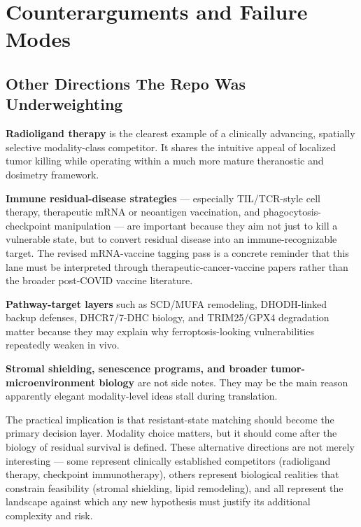 \documentclass[11pt,twoside,openright]{report}
\begin{document}
\chapter{Counterarguments and Failure Modes}


\section{Other Directions The Repo Was Underweighting}


\textbf{Radioligand therapy} is the clearest example of a clinically advancing, spatially selective modality-class competitor. It shares the intuitive appeal of localized tumor killing while operating within a much more mature theranostic and dosimetry framework.

\textbf{Immune residual-disease strategies} --- especially TIL/TCR-style cell therapy, therapeutic mRNA or neoantigen vaccination, and phagocytosis-checkpoint manipulation --- are important because they aim not just to kill a vulnerable state, but to convert residual disease into an immune-recognizable target. The revised mRNA-vaccine tagging pass is a concrete reminder that this lane must be interpreted through therapeutic-cancer-vaccine papers rather than the broader post-COVID vaccine literature.

\textbf{Pathway-target layers} such as SCD/MUFA remodeling, DHODH-linked backup defenses, DHCR7/7-DHC biology, and TRIM25/GPX4 degradation matter because they may explain why ferroptosis-looking vulnerabilities repeatedly weaken in vivo.

\textbf{Stromal shielding, senescence programs, and broader tumor-microenvironment biology} are not side notes. They may be the main reason apparently elegant modality-level ideas stall during translation.

The practical implication is that resistant-state matching should become the primary decision layer. Modality choice matters, but it should come after the biology of residual survival is defined. These alternative directions are not merely interesting --- some represent clinically established competitors (radioligand therapy, checkpoint immunotherapy), others represent biological realities that constrain feasibility (stromal shielding, lipid remodeling), and all represent the landscape against which any new hypothesis must justify its additional complexity and risk.
\end{document}
